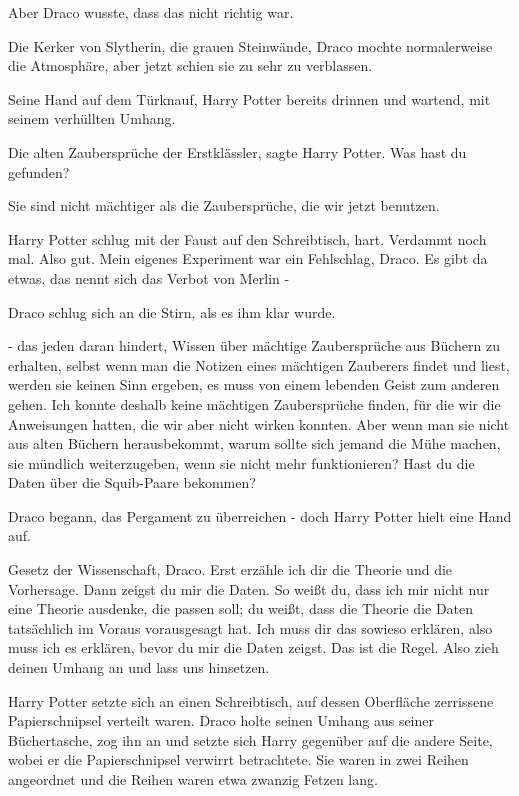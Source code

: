 Aber Draco wusste, dass das nicht richtig war.

Die Kerker von Slytherin, die grauen Steinwände, Draco mochte normalerweise die
Atmosphäre, aber jetzt schien sie zu sehr zu verblassen.

Seine Hand auf dem Türknauf, Harry Potter bereits drinnen und wartend, mit
seinem verhüllten Umhang.

\glqq Die alten Zaubersprüche der Erstklässler\grqq{}, sagte Harry Potter. \glqq
Was hast du gefunden?\grqq{}

\glqq Sie sind nicht mächtiger als die Zaubersprüche, die wir jetzt
benutzen.\grqq{}

Harry Potter schlug mit der Faust auf den Schreibtisch, hart. \glqq Verdammt
noch mal. Also gut. Mein eigenes Experiment war ein Fehlschlag, Draco. Es gibt
da etwas, das nennt sich das Verbot von Merlin -\grqq{}

Draco schlug sich an die Stirn, als es ihm klar wurde.

\glqq - das jeden daran hindert, Wissen über mächtige Zaubersprüche aus Büchern
zu erhalten, selbst wenn man die Notizen eines mächtigen Zauberers findet und
liest, werden sie keinen Sinn ergeben, es muss von einem lebenden Geist zum
anderen gehen. Ich konnte deshalb keine mächtigen Zaubersprüche finden, für die
wir die Anweisungen hatten, die wir aber nicht wirken konnten. Aber wenn man sie
nicht aus alten Büchern herausbekommt, warum sollte sich jemand die Mühe machen,
sie mündlich weiterzugeben, wenn sie nicht mehr funktionieren? Hast du die Daten
über die Squib-Paare bekommen?\grqq{}

Draco begann, das Pergament zu überreichen - doch Harry Potter hielt eine Hand
auf.

\glqq Gesetz der Wissenschaft, Draco. Erst erzähle ich dir die Theorie und die
Vorhersage. Dann zeigst du mir die Daten. So weißt du, dass ich mir nicht nur
eine Theorie ausdenke, die passen soll; du weißt, dass die Theorie die Daten
tatsächlich im Voraus vorausgesagt hat. Ich muss dir das sowieso erklären, also
muss ich es erklären, bevor du mir die Daten zeigst. Das ist die Regel. Also
zieh deinen Umhang an und lass uns hinsetzen.\grqq{}

Harry Potter setzte sich an einen Schreibtisch, auf dessen Oberfläche zerrissene
Papierschnipsel verteilt waren. Draco holte seinen Umhang aus seiner
Büchertasche, zog ihn an und setzte sich Harry gegenüber auf die andere Seite,
wobei er die Papierschnipsel verwirrt betrachtete. Sie waren in zwei Reihen
angeordnet und die Reihen waren etwa zwanzig Fetzen lang.

